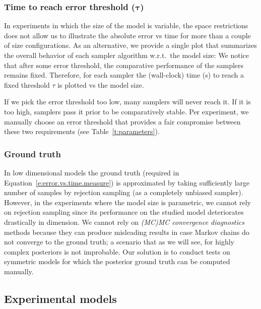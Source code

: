 \documentclass[]{article}
\begin{document}
\subsubsection*{Time to reach error threshold ($\boldsymbol\tau$)}
In experiments in which the size of the model is variable, 
the space restrictions does not allow us to illustrate the absolute error vs time 
for more than a couple of size configurations.
As an alternative, we provide a single plot that summarizes the overall behavior of each sampler algorithm w.r.t.\ the model size:
We notice that after some error threshold, the comparative performance of the samplers remains fixed.
Therefore, for each sampler the (wall-clock) time (s) to reach a fixed threshold $\tau$ is plotted vs the model size.

If we pick the error threshold too low, many samplers will never reach it. 
If it is too high, samplers pass it prior to be comparatively stable. 
Per experiment, we manually choose  an error threshold that provides a fair compromise between these two requirements
(see Table~\ref{t:parameters}).

\subsubsection*{Ground truth}
In low dimensional models %
the ground truth (required in Equation~\ref{e:error.vs.time.measure})
is approximated by taking sufficiently large number of samples by rejection sampling (as a completely unbiased sampler).
However, in the experiments where the model size is parametric,
we cannot rely on rejection sampling since its performance on the studied model deteriorates drastically in dimension. 
We cannot rely on \emph{(MC)MC convergence diagnostics} methods \citep{cowles1996markov} because they can produce misleading results in case Markov chains do not converge to the ground truth; a scenario that as we will see, for highly complex posteriors is not improbable.
Our solution is to conduct tests on symmetric models for which the posterior ground truth can be computed manually.


\subsection{Experimental models}
\label{sect:experimental.results.models}
\end{document}
